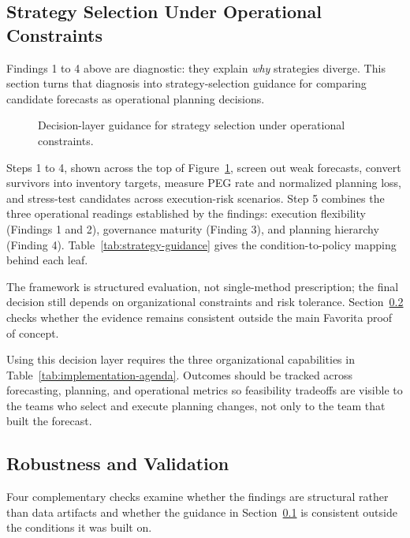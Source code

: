 \subsection{Strategy Selection Under Operational Constraints}
\label{sec:strategy-constraints}

Findings 1 to 4 above are diagnostic: they explain \emph{why} strategies diverge. This section turns that diagnosis into strategy-selection guidance for comparing candidate forecasts as operational planning decisions.

\begin{figure}[H]
\centering
\resizebox{\linewidth}{!}{}
\caption{Decision-layer guidance for strategy selection under operational constraints.}
\label{fig:strategy-guide}
\end{figure}

Steps 1 to 4, shown across the top of Figure~\ref{fig:strategy-guide}, screen out weak forecasts, convert survivors into inventory targets, measure PEG rate and normalized planning loss, and stress-test candidates across execution-risk scenarios. Step 5 combines the three operational readings established by the findings: execution flexibility (Findings 1 and 2), governance maturity (Finding 3), and planning hierarchy (Finding 4). Table~\ref{tab:strategy-guidance} gives the condition-to-policy mapping behind each leaf.



The framework is structured evaluation, not single-method prescription; the final decision still depends on organizational constraints and risk tolerance. Section~\ref{sec:validation} checks whether the evidence remains consistent outside the main Favorita proof of concept.

Using this decision layer requires the three organizational capabilities in Table~\ref{tab:implementation-agenda}. Outcomes should be tracked across forecasting, planning, and operational metrics so feasibility tradeoffs are visible to the teams who select and execute planning changes, not only to the team that built the forecast.



\subsection{Robustness and Validation}
\label{sec:validation}

Four complementary checks examine whether the findings are structural rather than data artifacts and whether the guidance in Section~\ref{sec:strategy-constraints} is consistent outside the conditions it was built on.

